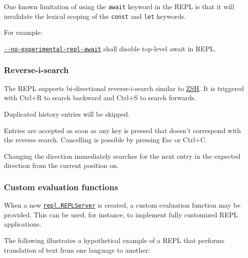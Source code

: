 One known limitation of using the \texttt{await} keyword in the REPL is
that it will invalidate the lexical scoping of the \texttt{const} and
\texttt{let} keywords.

For example:

\begin{Shaded}
\begin{Highlighting}[]
\end{Highlighting}
\end{Shaded}

\href{cli.md\#--no-experimental-repl-await}{\texttt{-\/-no-experimental-repl-await}}
shall disable top-level await in REPL.

\subsubsection{Reverse-i-search}\label{reverse-i-search}

The REPL supports bi-directional reverse-i-search similar to
\href{https://en.wikipedia.org/wiki/Z_shell}{ZSH}. It is triggered with
Ctrl+R to search backward and Ctrl+S to search forwards.

Duplicated history entries will be skipped.

Entries are accepted as soon as any key is pressed that doesn't
correspond with the reverse search. Cancelling is possible by pressing
Esc or Ctrl+C.

Changing the direction immediately searches for the next entry in the
expected direction from the current position on.

\subsubsection{Custom evaluation
functions}\label{custom-evaluation-functions}

When a new \hyperref[class-replserver]{\texttt{repl.REPLServer}} is
created, a custom evaluation function may be provided. This can be used,
for instance, to implement fully customized REPL applications.

The following illustrates a hypothetical example of a REPL that performs
translation of text from one language to another:

